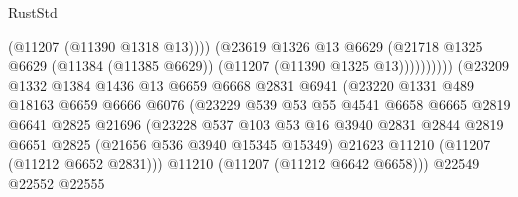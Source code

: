 \begin{lexlean}{RustStd}
\begin{coremodule}
                                              (@11207 (@11390 @1318 @13))))
                                          (@23619
                                            @1326
                                            @13
                                            @6629
                                            (@21718
                                              @1325
                                              @6629
                                              (@11384 (@11385 @6629))
                                              (@11207 (@11390 @1325 @13))))))))))
                              (@23209
                                @1332
                                @1384
                                @1436
                                @13
                                @6659
                                @6668
                                @2831
                                @6941
                                (@23220
                                  @1331
                                  @489
                                  @18163
                                  @6659
                                  @6666
                                  @6076
                                  (@23229
                                    @539
                                    @53
                                    @55
                                    @4541
                                    @6658
                                    @6665
                                    @2819
                                    @6641
                                    @2825
                                    @21696
                                    (@23228
                                      @537
                                      @103
                                      @53
                                      @16
                                      @3940
                                      @2831
                                      @2844
                                      @2819
                                      @6651
                                      @2825
                                      (@21656 @536 @3940 @15345 @15349)
                                      @21623
                                      @11210
                                      (@11207 (@11212 @6652 @2831)))
                                    @11210
                                    (@11207 (@11212 @6642 @6658)))
                                  @22549
                                  @22552
                                  @22555

\end{coremodule}
\end{lexlean}
